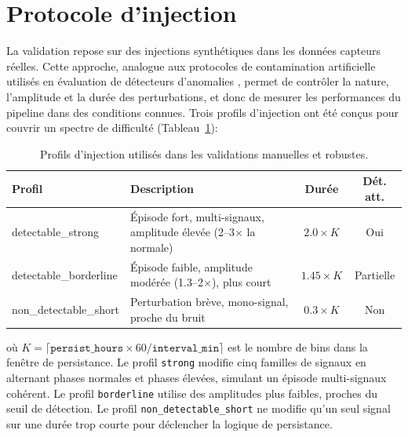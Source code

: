 \FloatBarrier
\section{Protocole d'injection}

La validation repose sur des injections synthétiques dans les données capteurs réelles. Cette
approche, analogue aux protocoles de contamination artificielle utilisés en évaluation de
détecteurs d'anomalies \citep{emmott2015metaanalysis,chandola2009anomaly}, permet de
contrôler la nature, l'amplitude et la durée des perturbations, et donc de mesurer les
performances du pipeline dans des conditions connues. Trois profils d'injection ont été
conçus pour couvrir un spectre de difficulté (Tableau~\ref{tab:injection_profiles}):

\begin{table}[H]
    \centering
    \caption{Profils d'injection utilisés dans les validations manuelles et robustes.}
    \label{tab:injection_profiles}
    \small
    \begin{tabular}{>{\ttfamily\raggedright\arraybackslash}p{4.1cm}
                    >{\raggedright\arraybackslash}p{3.7cm}cc}
        \toprule
        \textbf{\textrm{Profil}}     & \textbf{Description}
            & \textbf{Durée} & \textbf{Dét. att.} \\
        \midrule
        detectable\_strong  & Épisode fort, multi-signaux,
                                       amplitude élevée (2--3$\times$ la normale)
            & $2.0 \times K$ & Oui \\
        detectable\_borderline & Épisode faible, amplitude modérée
                                          (1.3--2$\times$), plus court
            & $1.45 \times K$ & Partielle \\
        non\_detectable\_short & Perturbation brève, mono-signal,
                                          proche du bruit
            & $0.3 \times K$ & Non \\
        \bottomrule
    \end{tabular}
\end{table}

\noindent
où $K = \lceil \texttt{persist\_hours} \times 60 / \texttt{interval\_min} \rceil$ est le
nombre de bins dans la fenêtre de persistance. Le profil \texttt{strong} modifie cinq
familles de signaux en alternant phases normales et phases élevées, simulant un épisode
multi-signaux cohérent. Le profil \texttt{borderline} utilise des amplitudes plus faibles,
proches du seuil de détection. Le profil \texttt{non\_detectable\_short} ne modifie qu'un
seul signal sur une durée trop courte pour déclencher la logique de persistance.

